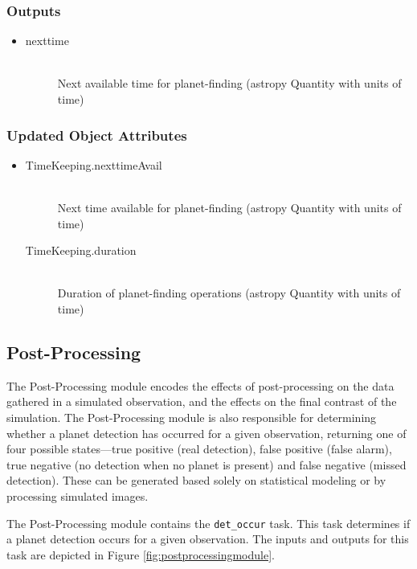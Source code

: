\documentclass[cleanfoot]{asme2ej}
\newcommand{\reffig}[1]{Figure \ref{#1}}
\begin{document}
\subsubsection*{Outputs}
\begin{itemize}
    \item 
    \begin{description}
        \item[nexttime] \hfill \\
        Next available time for planet-finding (astropy Quantity with units of time)
    \end{description}
\end{itemize}

\subsubsection*{Updated Object Attributes}
\begin{itemize}
    \item 
    \begin{description}
        \item[TimeKeeping.nexttimeAvail] \hfill \\
        Next time available for planet-finding (astropy Quantity with units of time)
        \item[TimeKeeping.duration] \hfill \\
        Duration of planet-finding operations (astropy Quantity with units of time)
    \end{description}
\end{itemize}


\subsection{Post-Processing}\label{sec:postprocessing}
The Post-Processing module encodes the effects of post-processing on the data gathered in a simulated observation, and the effects on the final contrast of the simulation.  The Post-Processing module is also responsible for determining whether a planet detection has occurred for a given observation, returning one of four possible states---true positive (real detection), false positive (false alarm), true negative (no detection when no planet is present) and false negative (missed detection).  These can be generated based solely on statistical modeling or by processing simulated images.

The Post-Processing module contains the \verb+det_occur+ task.  This task determines if a planet detection occurs for a given observation.  The inputs and outputs for this task are depicted in \reffig{fig:postprocessingmodule}.
\end{document}
